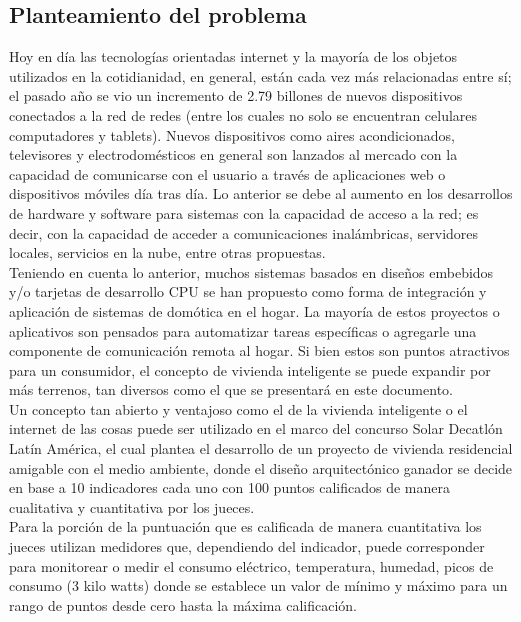 \subsection{Planteamiento del problema}

Hoy en día las tecnologías orientadas internet y la mayoría de los objetos utilizados en la cotidianidad, en general, están cada vez más relacionadas entre sí; el pasado año se vio un incremento de 2.79 billones de nuevos dispositivos conectados a la red de redes (entre los cuales no solo se encuentran celulares computadores y tablets). Nuevos dispositivos como aires acondicionados, televisores y electrodomésticos en general son lanzados al mercado con la capacidad de comunicarse con el usuario a través de aplicaciones web o dispositivos móviles día tras día. Lo anterior se debe al aumento en los desarrollos de hardware y software para sistemas con la capacidad de acceso a la red; es decir, con la capacidad de acceder a comunicaciones inalámbricas, servidores locales, servicios en la nube, entre otras propuestas.
\vspace{0.5cm}\\
Teniendo en cuenta lo anterior, muchos sistemas basados en diseños embebidos y/o tarjetas de desarrollo CPU se han propuesto como forma de integración y aplicación de sistemas de domótica en el hogar. La mayoría de estos proyectos o aplicativos son pensados para automatizar tareas específicas o agregarle una componente de comunicación remota al hogar. Si bien estos son puntos atractivos para un consumidor, el concepto de vivienda inteligente se puede expandir por más terrenos, tan diversos como el que se presentará en este documento.
\vspace{0.5cm}\\
Un concepto tan abierto y ventajoso como el de la vivienda inteligente o el internet de las cosas puede ser utilizado en el marco del concurso Solar Decatlón Latín América, el cual plantea el desarrollo de un proyecto de vivienda residencial amigable con el medio ambiente, donde el diseño arquitectónico ganador se decide en base a 10 indicadores cada uno con 100 puntos calificados de manera cualitativa y cuantitativa por los jueces.
\vspace{0.5cm}\\
Para la porción de la puntuación que es calificada de manera cuantitativa los jueces utilizan medidores que, dependiendo del indicador, puede corresponder para monitorear o medir el consumo eléctrico, temperatura, humedad, picos de consumo (3 kilo watts) donde se establece un valor de mínimo y máximo para un rango de puntos desde cero hasta la máxima calificación.
